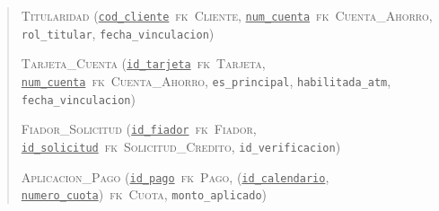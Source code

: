 \begin{quote}\raggedright
\textsc{Titularidad} (\underline{\texttt{cod\_cliente}}~\textsc{fk}~\textsc{Cliente}, \underline{\texttt{num\_cuenta}}~\textsc{fk}~\textsc{Cuenta\_Ahorro}, \texttt{rol\_titular}, \texttt{fecha\_vinculacion})

\textsc{Tarjeta\_Cuenta} (\underline{\texttt{id\_tarjeta}}~\textsc{fk}~\textsc{Tarjeta}, \underline{\texttt{num\_cuenta}}~\textsc{fk}~\textsc{Cuenta\_Ahorro}, \texttt{es\_principal}, \texttt{habilitada\_atm}, \texttt{fecha\_vinculacion})

\textsc{Fiador\_Solicitud} (\underline{\texttt{id\_fiador}}~\textsc{fk}~\textsc{Fiador}, \underline{\texttt{id\_solicitud}}~\textsc{fk}~\textsc{Solicitud\_Credito}, \texttt{id\_verificacion})

\textsc{Aplicacion\_Pago} (\underline{\texttt{id\_pago}}~\textsc{fk}~\textsc{Pago}, (\underline{\texttt{id\_calendario}}, \underline{\texttt{numero\_cuota}})~\textsc{fk}~\textsc{Cuota}, \texttt{monto\_aplicado})
\end{quote}
